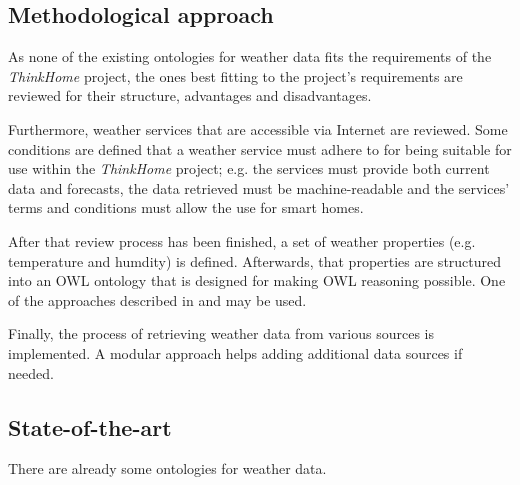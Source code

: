 \documentclass{scrartcl}
\begin{document}
\subsection*{Methodological approach}
As none of the existing ontologies for weather data fits the requirements of the \textit{ThinkHome} project, the ones best fitting to the project's requirements are reviewed for their structure, advantages and disadvantages.

Furthermore, weather services that are accessible via Internet are reviewed. Some conditions are defined that a weather service must adhere to for being suitable for use within the \textit{ThinkHome} project; e.g. the services must provide both current data and forecasts, the data retrieved must be machine-readable and the services' terms and conditions must allow the use for smart homes.

After that review process has been finished, a set of weather properties (e.g. temperature and humdity) is defined. Afterwards, that properties are structured into an OWL ontology that is designed for making OWL reasoning possible. One of the approaches described in \cite{Ontology101} and \cite{SoftwareEngineeringOntology} may be used.

Finally, the process of retrieving weather data from various sources is implemented. A modular approach helps adding additional data sources if needed.

\subsection*{State-of-the-art}

There are already some ontologies for weather data.


\end{document}
